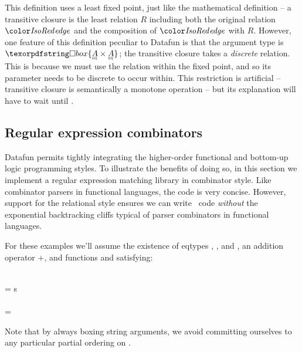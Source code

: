 \noindent
This definition uses a least fixed point, just like the mathematical definition
-- a transitive closure is the least relation $R$ including both the original
relation $\dvar{edge}$ and the composition of $\dvar{edge}$ with $R$.
%
However, one feature of this definition peculiar to Datafun is that the argument
type is $\iso \tset{\eqt A \times \eqt A}$; the transitive closure takes a
\emph{discrete} relation.
%
This is because we must use the relation within the fixed point, and so its
parameter needs to be discrete to occur within.
%
This restriction is artificial -- transitive closure is semantically a monotone
operation -- but its explanation will have to wait until .


\subsection{Regular expression combinators}
\label{regular-expression-combinators}

\newcommand\tre{\typename{regex}}
\newcommand\tchar{\typename{char}}

Datafun permits tightly integrating the higher-order functional and bottom-up
logic programming styles. To illustrate the benefits of doing so, in this
section we implement a regular expression matching library in combinator style.
Like combinator parsers in functional languages, the code is very concise.
%
However, support for the relational style ensures we can write \naive\ code
\emph{without} the exponential backtracking cliffs typical of parser combinators
in functional languages.

For these examples we'll assume the existence of eqtypes \tstring, \tchar, and
\tint, an addition operator $+$, and functions  and 
satisfying:

\begin{code}
   \isa \iso\tstring \to \tint\\
   \< = \dvar s
  \\[1em]
   \isa \iso\tstring \to \tset{\tint \x \tchar}\\
   \< =
\end{code}

\noindent
Note that by always boxing string arguments, we avoid committing ourselves to
any particular partial ordering on \tstring.

